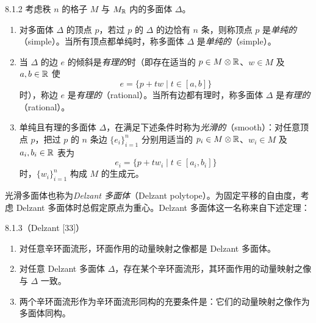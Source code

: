 \begin{definition}{8.1.2}
  考虑秩 $n$ 的格子 $M$ 与 $M_{\mathbb{R}}$ 内的多面体 $\Delta$。
  \begin{enumerate}[label=(\arabic*),leftmargin=2.2em,itemsep=2pt]
    \item 对多面体 $\Delta$ 的顶点 $p$，若过 $p$ 的 $\Delta$ 的边恰有 $n$ 条，则称顶点 $p$ 是\emph{单纯的}（simple）。当所有顶点都单纯时，称多面体 $\Delta$ 是\emph{单纯的}（simple）。
    \item 当 $\Delta$ 的边 $e$ 的倾斜是\emph{有理的}时（即存在适当的 $p\in M\otimes\mathbb{R}$、$w\in M$ 及 $a,b\in\mathbb{R}$ 使
      \begin{equation}
        e=\{p+tw\mid t\in[a,b]\} \tag{8.1.4}
      \end{equation}
      时），称边 $e$ 是\emph{有理的}（rational）。当所有边都有理时，称多面体 $\Delta$ 是\emph{有理的}（rational）。
    \item
      单纯且有理的多面体 $\Delta$，在满足下述条件时称为\emph{光滑的}（smooth）：对任意顶点 $p$，把过 $p$ 的 $n$ 条边 $\{e_i\}_{i=1}^{n}$ 分别用适当的 $p_i\in M\otimes\mathbb{R}$、$w_i\in M$ 及 $a_i,b_i\in\mathbb{R}$ 表为
      \begin{equation}
        e_i=\{p+tw_i\mid t\in[a_i,b_i]\} \tag{8.1.5}
      \end{equation}
      时，$\{w_i\}_{i=1}^{n}$ 构成 $M$ 的生成元。
  \end{enumerate}
\end{definition}

光滑多面体也称为\emph{Delzant 多面体}（Delzant polytope）。为固定平移的自由度，考虑 Delzant 多面体时总假定原点为重心。Delzant 多面体这一名称来自下述定理：

\begin{theorem}{8.1.3}（Delzant [33]）
  \begin{enumerate}[label=(\arabic*),leftmargin=2.2em,itemsep=2pt]
    \item 对任意辛环面流形，环面作用的动量映射之像都是 Delzant 多面体。
    \item 对任意 Delzant 多面体 $\Delta$，存在某个辛环面流形，其环面作用的动量映射之像与 $\Delta$ 一致。
    \item 两个辛环面流形作为辛环面流形同构的充要条件是：它们的动量映射之像作为多面体同构。
  \end{enumerate}
\end{theorem}

